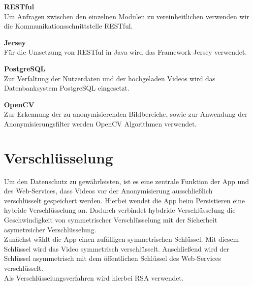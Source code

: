 \begin{description}
\item \textbf{RESTful} \hfill \\
Um Anfragen zwischen den einzelnen Modulen zu vereinheitlichen verwenden wir die Kommunikationsschnittstelle RESTful.

\item \textbf{Jersey} \hfill \\
Für die Umsetzung von RESTful in Java wird das Framework Jersey verwendet.

\item \textbf{PostgreSQL} \hfill \\
Zur Verfaltung der Nutzerdaten und der hochgeladen Videos wird das Datenbanksystem PostgreSQL eingesetzt.

\item \textbf{OpenCV} \hfill \\
Zur Erkennung der zu anonymisierenden Bildbereiche, sowie zur Anwendung der Anonymisierungsfilter werden OpenCV Algorithmen verwendet.

\end{description}

\section{Verschlüsselung}

Um den Datenschutz zu gewährleisten, ist es eine zentrale Funktion der App und des Web-Services, dass Videos vor der Anonymisierung ausschließlich verschlüsselt gespeichert werden. Hierbei wendet die App beim Persistieren eine hybride Verschlüsselung an. Dadurch verbindet hybdride Verschlüsselung die Geschwindigkeit von symmetrischer Verschlüsselung mit der Sicherheit asymetrsicher Verschlüsselung.\\
Zunächst wählt die App einen zufälligen symmetrischen Schlüssel. Mit diesem Schlüssel wird das Video symmetrisch verschlüsselt. Anschließend wird der Schlüssel asymmetrisch mit dem öffentlichen Schlüssel des Web-Services verschlüsselt. \\
Als Verschlüsselungsverfahren wird hierbei RSA verwendet.
